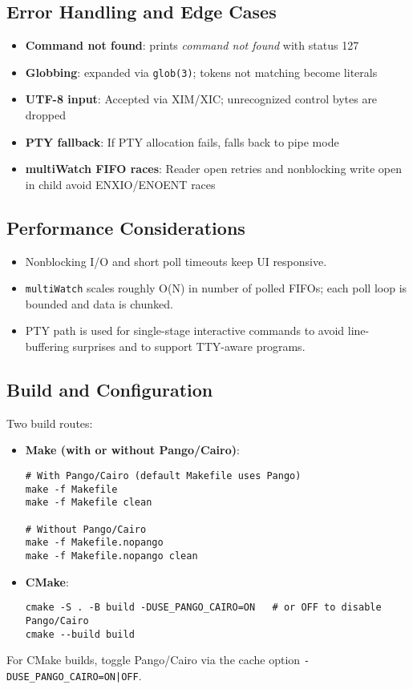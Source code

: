 \documentclass[11pt,a4paper]{article}
\begin{document}
\subsection{Error Handling and Edge Cases}
\begin{itemize}[leftmargin=*]
  \item \textbf{Command not found}: prints \emph{command not found} with status 127
  \item \textbf{Globbing}: expanded via \texttt{glob(3)}; tokens not matching become literals
  \item \textbf{UTF-8 input}: Accepted via XIM/XIC; unrecognized control bytes are dropped
  \item \textbf{PTY fallback}: If PTY allocation fails, falls back to pipe mode
  \item \textbf{multiWatch FIFO races}: Reader open retries and nonblocking write open in child avoid ENXIO/ENOENT races
\end{itemize}

\subsection{Performance Considerations}
\begin{itemize}[leftmargin=*]
  \item Nonblocking I/O and short poll timeouts keep UI responsive.
  \item \texttt{multiWatch} scales roughly O(N) in number of polled FIFOs; each poll loop is bounded and data is chunked.
  \item PTY path is used for single-stage interactive commands to avoid line-buffering surprises and to support TTY-aware programs.
\end{itemize}

\subsection{Build and Configuration}
Two build routes:
\begin{itemize}[leftmargin=*]
  \item \textbf{Make (with or without Pango/Cairo)}:
\begin{lstlisting}[style=code]
# With Pango/Cairo (default Makefile uses Pango)
make -f Makefile
make -f Makefile clean

# Without Pango/Cairo
make -f Makefile.nopango
make -f Makefile.nopango clean
\end{lstlisting}
  \item \textbf{CMake}:
\begin{lstlisting}[style=code]
cmake -S . -B build -DUSE_PANGO_CAIRO=ON   # or OFF to disable Pango/Cairo
cmake --build build
\end{lstlisting}
\end{itemize}
For CMake builds, toggle Pango/Cairo via the cache option \texttt{-DUSE\_PANGO\_CAIRO=ON|OFF}.
\end{document}
